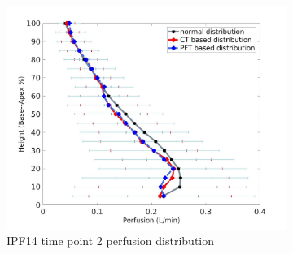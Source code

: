 \begin{figure}[htbp]
\begin{subfigure}{.6\linewidth}
  \includegraphics[width=\linewidth,trim={{.0\wd0} {.0\wd0} {.0\wd0} {.0\wd0}},clip]{Appendix/Image_AppexB/IPF1402/IPF1402_PerfusionAgainstLungHeight.jpg}
  \caption{IPF14 time point 2 perfusion distribution}
  \label{fig:IPF1402VQDistribution-b}
\end{subfigure}
\begin{subfigure}{.6\linewidth}%

\end{subfigure}
\end{figure}
